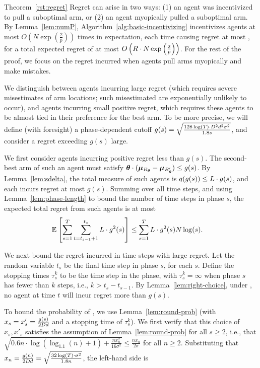 \begin{extraproof}{Theorem~\ref{rst:regret}}
Regret can arise in two ways:
(1) an agent was incentivized to pull a suboptimal arm, or
(2) an agent myopically pulled a suboptimal arm.
By Lemma~\ref{lem:numP}, Algorithm~\ref{alg:basic-incentivizing}
incentivizes agents at most 
$O\left( N\exp\left(\frac{2}{p}\right) \right)$
times in expectation, each time causing regret at most \MAXR,
for a total expected regret of at most
$O\left(R\cdot N\exp\left(\frac{2}{p}\right) \right)$.
For the rest of the proof, we focus on the regret incurred when agents
pull arms myopically and make mistakes.

We distinguish between agents incurring large regret
(which requires severe misestimates of arm locations;
such misestimated are exponentially unlikely to occur), 
and agents incurring small positive regret,
which requires these agents to be almost tied in their preference for
the best arm.
To be more precise, we will define (with foresight) a phase-dependent
cutoff
$g(s) = \sqrt{\frac{128\log(T) \cdot D^2 d^2 \sigma^2}{1.8 s}}$,
and consider a regret exceeding $g(s)$ large.

We first consider agents \AgV incurring positive regret less than $g(s)$.
The second-best arm \Second{\AgV} of such an agent \AgV must satisfy
$\bm{\theta} \cdot (\bm{\mu}_{B_{\bm{\theta}}} - \bm{\mu}_{B'_{\bm{\theta}}}) \leq g(s)$.
By Lemma~\ref{lem:sdelta}, the total measure of such agents
is $q(g(s)) \leq L \cdot g(s)$,
and each incurs regret at most $g(s)$.
Summing over all time steps,
and using Lemma~\ref{lem:phase-length} to bound the number of time
steps in phase $s$, 
the expected total regret from such agents is at most
\begin{align}
\Expect{\sum_{s=1}^{T} \sum_{t=t_{s-1}+1}^{t_{s}} \TieDensity \cdot g^2(s)}
& \leq \sum_{s=1}^{T} \TieDensity \cdot g^2(s) \ARMNUM \log(s).
\label{equ:small_regret_bound}
\end{align}

We next bound the regret incurred in time steps with large regret.
Let the random variable $t_s$ be the final time step in phase $s$,
for each $s$. Define the stopping times $\tau_{s}^{k}$ to be the 
time step in the  phase,
with $\tau_{s}^{k} = \infty$ when phase $s$ has fewer than $k$ steps,
i.e., $k > t_{s}-t_{s-1}$.
By Lemma~\ref{lem:right-choice},
under , no agent at time $t$ will incur
regret more than $g(s)$.

To bound the probability of ,
we use Lemma~\ref{lem:round-prob}
(with $x_s = x'_s = \frac{g(s)}{2 D d}$
and a stopping time of $\tau_s^k$).
We first verify that this choice of $x_s, x'_s$
satisfies the assumption of Lemma~\ref{lem:round-prob} for all
$s \geq 2$,
i.e., that
$\sqrt{0.6 n \cdot \log (\log_{1.1}(n) + 1) + \frac{n x_n^2}{16 \sigma^2}}
\leq \frac{n x_n}{2 \sigma}$
for all $n \geq 2$.
Substituting that
$x_n = \frac{g(n)}{2 D d} = \sqrt{\frac{32\log(T) \cdot \sigma^2}{1.8 n}}$,
the left-hand side is


\end{extraproof}
